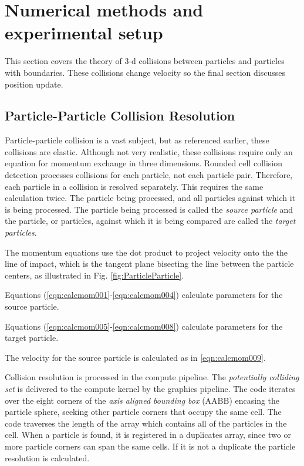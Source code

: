 \newpage
\clearpage
\section{Numerical methods and experimental setup } 

This section covers the theory of 3-d collisions between particles and particles with boundaries. These collisions change velocity so the final section discusses position update.

\subsection{Particle-Particle Collision Resolution} \label{pph}

Particle-particle collision is a vast subject, but as referenced earlier, these collisions are elastic. Although not very realistic, these collisions require only an equation for momentum exchange in three dimensions. Rounded cell collision detection processes collisions for each particle, not each particle pair. Therefore, each particle in a collision is resolved separately. This requires the same calculation twice. The particle being processed, and all particles against which it is being processed. The particle being processed is called the \textit{source particle} and the particle, or particles, against which it is being compared are called the \textit{target particles}.

The momentum equations use the dot product to project velocity onto the the line of impact, which is the tangent plane bisecting the line between the particle centers, as illustrated in Fig. \ref{fig:ParticleParticle}.


Equations (\ref{eqn:calcmom001}-\ref{eqn:calcmom004}) calculate parameters for the source particle.





Equations (\ref{eqn:calcmom005}-\ref{eqn:calcmom008}) calculate parameters for the target particle.





The velocity for the source particle is calculated as in \ref{eqn:calcmom009}.


Collision resolution is processed in the compute pipeline. The \textit{potentially colliding set} is delivered to the compute kernel by the graphics pipeline. The code iterates over the eight corners of the \textit{axis aligned bounding box} (AABB) encasing the particle sphere, seeking other particle corners that occupy the same cell. The code traverses the length of the array which contains all of the particles in the cell. When a particle is found, it is registered in a duplicates array, since two or more particle corners can span the same cells. If it is not a duplicate the particle resolution is calculated.


